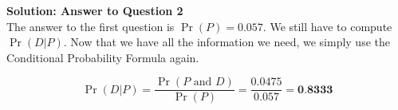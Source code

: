 	\noindent \textbf{Solution: Answer to Question 2}\\
	\noindent The answer to the first question is $\Pr(P) =  0.057$. We still have to compute $\Pr(D|P)$. Now that we have all the information we need, we simply use the Conditional Probability Formula again.
	{
		\large
		\[\Pr(D|P) = \frac{\Pr(P \mbox{ and } D)}{\Pr(P)} = \frac{0.0475}{0.057} = \textbf{0.8333}\]
		
	}
	
	
